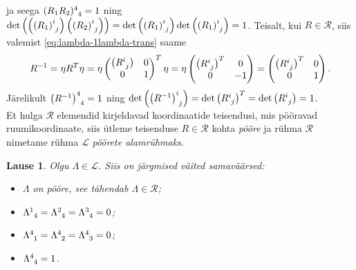 \documentclass[a4paper,12pt]{article}
\theoremstyle{plain}
\newtheorem{lause}{Lause}[section]
\theoremstyle{definition}
\numberwithin{equation}{section}
\begin{document}
ja seega $(R_1 R_2)\indices{^4_4} = 1$ ning $\det \left(\left(\left(R_1\right)\indices{^i_j}\right) \left(\left(R_2\right)\indices{^i_j}\right) \right) = \det \left(\left(R_1\right)\indices{^i_j}\right) \det \left(\left(R_1\right)\indices{^i_j}\right) = 1$.
Teisalt, kui $R \in \mathcal{R}$, siis valemist \ref{eq:lambda-1lambda-trans} saame
\begin{align*}
R^{-1} = \eta R^T \eta = \eta \begin{pmatrix}
\left(R\indices{^i_j}\right) & 0 \\ 
0 & 1 \\ \end{pmatrix}^T \eta = 
\eta \begin{pmatrix}
\left(R\indices{^i_j}\right)^T & 0 \\ 
0 & -1 \\ \end{pmatrix} = \begin{pmatrix}
\left(R\indices{^i_j}\right)^T & 0 \\ 
0 & 1 \\ \end{pmatrix}.
\end{align*}
Järelikult $\left(R^{-1}\right)\indices{^4_4} = 1$ ning $\det \left(\left(R^{-1}\right)\indices{^i_j}\right) = \det \left(R\indices{^i_j}\right)^T = \det \left(R\indices{^i_j}\right) = 1$. \\
Et hulga $\mathcal{R}$ elemendid kirjeldavad koordinaatide teisendusi, mis pööravad ruumikoordinaate, siis ütleme teisenduse $R \in \mathcal{R}$ kohta \emph{pööre} ja rühma $\mathcal{R}$ nimetame rühma $\mathcal{L}$ \emph{pöörete alamrühmaks}.

\begin{lause}
Olgu $\Lambda \in \mathcal{L}$. Siis on järgmised väited samaväärsed:
\begin{itemize}
\item[(i)] $\Lambda$ on pööre, see tähendab $\Lambda \in \mathcal{R}$;
\item[(ii)] $\Lambda\indices{^1_4} = \Lambda\indices{^2_4} = \Lambda\indices{^3_4} = 0$;
\item[(iii)] $\Lambda\indices{^4_1} = \Lambda\indices{^4_2} = \Lambda\indices{^4_3} = 0$;
\item[(iv)] $\Lambda\indices{^4_4} = 1$.
\end{itemize}
\end{lause}
\end{document}
